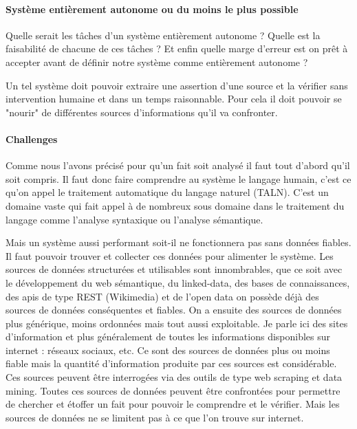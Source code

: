 
\paragraph{Système entièrement autonome ou du moins le plus possible}

Quelle serait les tâches d'un système entièrement autonome ? Quelle est la faisabilité de chacune de ces tâches ? Et enfin quelle marge d'erreur est on prêt à accepter avant de définir notre système comme entièrement autonome ?

Un tel système doit pouvoir extraire une assertion d'une source et la vérifier sans intervention humaine et dans un temps raisonnable. Pour cela il doit pouvoir se "nourir" de différentes sources d'informations qu'il va confronter.

\paragraph{Challenges}

Comme nous l'avons précisé pour qu'un fait soit analysé il faut tout d'abord qu'il soit compris. Il faut donc faire comprendre au système le langage humain, c'est ce qu'on appel le traitement automatique du langage naturel (TALN). C'est un domaine vaste qui fait appel à de nombreux sous domaine dans le traitement du langage comme l'analyse syntaxique ou l'analyse sémantique.


Mais un système aussi performant soit-il ne fonctionnera pas sans données fiables. Il faut pouvoir trouver et collecter ces données pour alimenter le système. Les sources de données structurées et utilisables sont innombrables, que ce soit avec le développement du web sémantique, du linked-data, des bases de connaissances, des apis de type REST (Wikimedia) et de l'open data on possède déjà des sources de données conséquentes et fiables. On a ensuite des sources de données plus générique, moins ordonnées mais tout aussi exploitable. Je parle ici des sites d'information et plus généralement de toutes les informations disponibles sur internet : réseaux sociaux, etc. Ce sont des sources de données plus ou moins fiable mais la quantité d'information produite par ces sources est considérable. Ces sources peuvent être interrogées via des outils de type web scraping et data mining.
Toutes ces sources de données peuvent être confrontées pour permettre de chercher et étoffer un fait pour pouvoir le comprendre et le vérifier.
Mais les sources de données ne se limitent pas à ce que l'on trouve sur internet.

